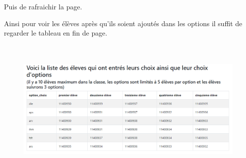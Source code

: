 \documentclass[12pt]{article}
\begin{document}
\vspace{\baselineskip}
\tab Puis de rafraichir la page.\par

\begin{adjustwidth}{0.49in}{0.0in}
Ainsi pour voir les élèves après qu’ils soient ajoutés dans les options il suffit de regarder le tableau en fin de page.\par

\end{adjustwidth}




\begin{figure}[H]
	\begin{Center}
		\includegraphics[width=6.29in,height=2.71in]{./media/image8.png}
	\end{Center}
\end{figure}



\par


\vspace{\baselineskip}

\printbibliography
\end{document}
